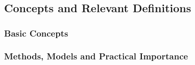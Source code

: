 
\chapter{} %



\ifpdf
    \graphicspath{{X/figures/PNG/}{X/figures/PDF/}{X/figures/}}
\else
    \graphicspath{{X/figures/EPS/}{X/figures/}}
\fi

\section{Concepts and Relevant Definitions}
\subsection{Basic Concepts}
\subsection{Methods, Models and Practical Importance}


